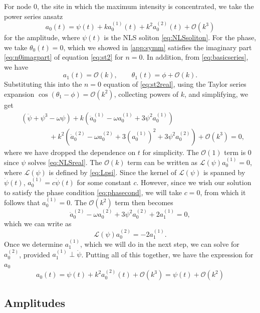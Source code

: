 \documentclass[11pt,reqno]{amsart}
\def\calL{{\mathcal L}}
\begin{document}
For node 0, the site in which the maximum intensity is concentrated, we take the power series ansatz 
\[
a_0(t) = \psi(t) + k a_0^{(1)}(t) + k^2 a_0^{(2)}(t) + \mathcal{O}(k^3)
\]
for the amplitude, where $\psi(t)$ is the NLS soliton \cref{eq:NLSsoliton}. For the phase, we take $\theta_0(t) = 0$, which we showed in \cref{app:symm} satisfies the imaginary part \cref{eq:n0imagpart} of equation \cref{eq:st2} for $n=0$. In addition, from \cref{eq:basicseries}, we have
\[
a_1(t) = \mathcal{O}(k), \qquad \theta_1(t) = \phi + \mathcal{O}(k).
\]
Substituting this into the $n=0$ equation of \cref{eq:st2real}, using the Taylor series expansion $\cos(\theta_1-\phi) = \mathcal{O}(k^2)$, collecting powers of $k$, and simplifying, we get
\begin{equation*}
\begin{aligned}
&\left(\ddot{\psi} + \psi^3 - \omega \psi\right) 
+ k\left(\ddot a_0^{(1)} - \omega a_0^{(1)} + 3 \psi^2 a_0^{(1)}\right) \\
&\qquad\qquad+ k^2\left(\ddot a_0^{(2)} - \omega a_0^{(2)} + 3\left(a_0^{(1)}\right)^2 + 3 \psi^2 a_0^{(2)}\right) + \mathcal{O}(k^3) = 0,
\end{aligned}
\end{equation*}
where we have dropped the dependence on $t$ for simplicity. The $\mathcal{O}(1)$ term is 0 since $\psi$ solves \cref{eq:NLSreal}. The $\mathcal{O}(k)$ term can be written as $\calL(\psi)a_0^{(1)}=0$, where $\calL(\psi)$ is defined by \cref{eq:Lpsi}. Since the kernel of $\calL(\psi)$ is spanned by $\dot \psi(t)$, $a_0^{(1)} = c \dot \psi(t)$ for some constant $c$. However, since we wish our solution to satisfy the phase condition \cref{eq:phasecond}, we will take $c = 0$, from which it follows that $a_0^{(1)} = 0$. The $\mathcal{O}(k^2)$ term then becomes
\[
\ddot a_0^{(2)} - \omega a_0^{(2)} + 3 \psi^2 a_0^{(2)} + 2 a_1^{(1)} = 0, 
\]
which we can write as 
\[
\calL(\psi) a_0^{(2)} = -2 a_1^{(1)}.
\]
Once we determine $a_1^{(1)}$, which we will do in the next step, we can solve for $a_0^{(2)}$, provided $a_1^{(1)} \perp \dot\psi$. Putting all of this together, we have the expression for $a_0$
\begin{equation}\label{eq:a0eq}
a_0(t) = \psi(t) + k^2 a_0^{(2)}(t) + \mathcal{O}(k^3) = \psi(t) + \mathcal{O}(k^2)
\end{equation}

\subsection{Amplitudes}
\end{document}
